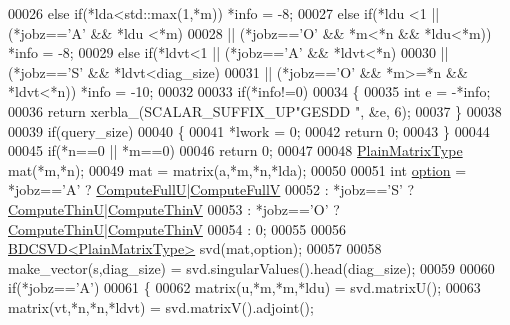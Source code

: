 \begin{DoxyCode}
00026   \textcolor{keywordflow}{else}  \textcolor{keywordflow}{if}(*lda<std::max(1,*m))                                   *info = -8;
00027   \textcolor{keywordflow}{else}  \textcolor{keywordflow}{if}(*ldu <1 || (*jobz==\textcolor{charliteral}{'A'} && *ldu <*m)
00028                    || (*jobz==\textcolor{charliteral}{'O'} && *m<*n && *ldu<*m))           *info = -8;
00029   \textcolor{keywordflow}{else}  \textcolor{keywordflow}{if}(*ldvt<1 || (*jobz==\textcolor{charliteral}{'A'} && *ldvt<*n)
00030                    || (*jobz==\textcolor{charliteral}{'S'} && *ldvt<diag\_size)
00031                    || (*jobz==\textcolor{charliteral}{'O'} && *m>=*n && *ldvt<*n))         *info = -10;
00032   
00033   \textcolor{keywordflow}{if}(*info!=0)
00034   \{
00035     \textcolor{keywordtype}{int} e = -*info;
00036     \textcolor{keywordflow}{return} xerbla\_(SCALAR\_SUFFIX\_UP\textcolor{stringliteral}{"GESDD "}, &e, 6);
00037   \}
00038   
00039   \textcolor{keywordflow}{if}(query\_size)
00040   \{
00041     *lwork = 0;
00042     \textcolor{keywordflow}{return} 0;
00043   \}
00044   
00045   \textcolor{keywordflow}{if}(*n==0 || *m==0)
00046     \textcolor{keywordflow}{return} 0;
00047   
00048   \hyperlink{group___core___module_class_eigen_1_1_matrix}{PlainMatrixType} mat(*m,*n);
00049   mat = matrix(a,*m,*n,*lda);
00050   
00051   \textcolor{keywordtype}{int} \hyperlink{structoption}{option} = *jobz==\textcolor{charliteral}{'A'} ? \hyperlink{group__enums_ggae3e239fb70022eb8747994cf5d68b4a9a2b4f91ca5859a4159dbfe8090043817f}{ComputeFullU}|\hyperlink{group__enums_ggae3e239fb70022eb8747994cf5d68b4a9a52c6f7e80bbf9a42297c88f700245b51}{ComputeFullV}
00052              : *jobz==\textcolor{charliteral}{'S'} ? \hyperlink{group__enums_ggae3e239fb70022eb8747994cf5d68b4a9af8c742a1aa87773e165eae406c9ccaf8}{ComputeThinU}|\hyperlink{group__enums_ggae3e239fb70022eb8747994cf5d68b4a9a1055e53fa95c8ae04a07ebb72cfafd95}{ComputeThinV}
00053              : *jobz==\textcolor{charliteral}{'O'} ? \hyperlink{group__enums_ggae3e239fb70022eb8747994cf5d68b4a9af8c742a1aa87773e165eae406c9ccaf8}{ComputeThinU}|\hyperlink{group__enums_ggae3e239fb70022eb8747994cf5d68b4a9a1055e53fa95c8ae04a07ebb72cfafd95}{ComputeThinV}
00054              : 0;
00055 
00056   \hyperlink{group___s_v_d___module_class_eigen_1_1_b_d_c_s_v_d}{BDCSVD<PlainMatrixType>} svd(mat,option);
00057   
00058   make\_vector(s,diag\_size) = svd.singularValues().head(diag\_size);
00059 
00060   \textcolor{keywordflow}{if}(*jobz==\textcolor{charliteral}{'A'})
00061   \{
00062     matrix(u,*m,*m,*ldu)   = svd.matrixU();
00063     matrix(vt,*n,*n,*ldvt) = svd.matrixV().adjoint();

\end{DoxyCode}
